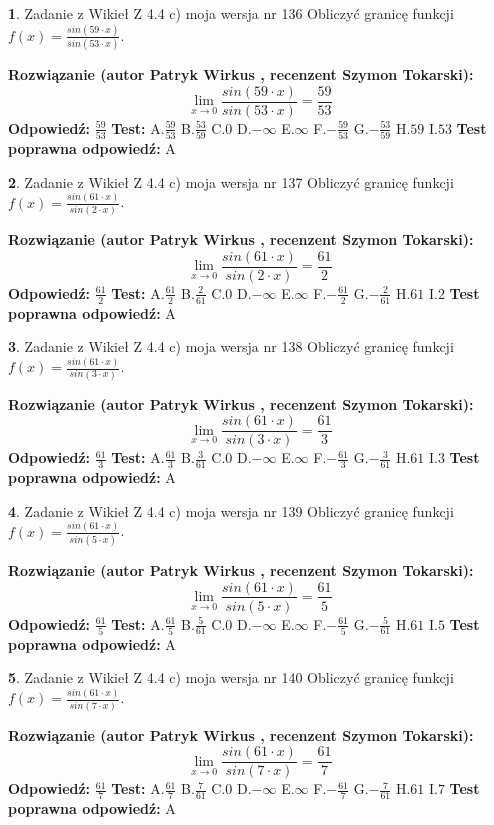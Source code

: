 \documentclass[12pt, a4paper]{article}
\theoremstyle{definition} %
\newtheorem{zad}{}
\newcommand{\zadStart}[1]{\begin{zad}#1\newline}
\newcommand{\zadStop}{\end{zad}}
\newcommand{\rozwStart}[2]{\noindent \textbf{Rozwiązanie (autor #1 , recenzent #2): }\newline}
\newcommand{\rozwStop}{\newline}
\newcommand{\odpStart}{\noindent \textbf{Odpowiedź:}\newline}
\newcommand{\odpStop}{\newline}
\newcommand{\testStart}{\noindent \textbf{Test:}\newline}
\newcommand{\testStop}{\newline}
\newcommand{\kluczStart}{\noindent \textbf{Test poprawna odpowiedź:}\newline}
\newcommand{\kluczStop}{\newline}
\begin{document}
\zadStart{Zadanie z Wikieł Z 4.4 c) moja wersja nr 136}
Obliczyć granicę funkcji $f(x)=\frac{sin(59\cdot x)}{sin(53\cdot x)}$.
\zadStop
\rozwStart{Patryk Wirkus}{Szymon Tokarski}
$$\lim\limits_{x\to 0}\frac{sin(59\cdot x)}{sin(53\cdot x)}=
\frac{59}{53}$$
\rozwStop
\odpStart
$\frac{59}{53}$
\odpStop
\testStart
A.$\frac{59}{53}$
B.$\frac{53}{59}$
C.$0$
D.$-\infty$
E.$\infty$
F.$-\frac{59}{53}$
G.$-\frac{53}{59}$
H.$59$
I.$53$
\testStop
\kluczStart
A
\kluczStop



\zadStart{Zadanie z Wikieł Z 4.4 c) moja wersja nr 137}
Obliczyć granicę funkcji $f(x)=\frac{sin(61\cdot x)}{sin(2\cdot x)}$.
\zadStop
\rozwStart{Patryk Wirkus}{Szymon Tokarski}
$$\lim\limits_{x\to 0}\frac{sin(61\cdot x)}{sin(2\cdot x)}=
\frac{61}{2}$$
\rozwStop
\odpStart
$\frac{61}{2}$
\odpStop
\testStart
A.$\frac{61}{2}$
B.$\frac{2}{61}$
C.$0$
D.$-\infty$
E.$\infty$
F.$-\frac{61}{2}$
G.$-\frac{2}{61}$
H.$61$
I.$2$
\testStop
\kluczStart
A
\kluczStop



\zadStart{Zadanie z Wikieł Z 4.4 c) moja wersja nr 138}
Obliczyć granicę funkcji $f(x)=\frac{sin(61\cdot x)}{sin(3\cdot x)}$.
\zadStop
\rozwStart{Patryk Wirkus}{Szymon Tokarski}
$$\lim\limits_{x\to 0}\frac{sin(61\cdot x)}{sin(3\cdot x)}=
\frac{61}{3}$$
\rozwStop
\odpStart
$\frac{61}{3}$
\odpStop
\testStart
A.$\frac{61}{3}$
B.$\frac{3}{61}$
C.$0$
D.$-\infty$
E.$\infty$
F.$-\frac{61}{3}$
G.$-\frac{3}{61}$
H.$61$
I.$3$
\testStop
\kluczStart
A
\kluczStop



\zadStart{Zadanie z Wikieł Z 4.4 c) moja wersja nr 139}
Obliczyć granicę funkcji $f(x)=\frac{sin(61\cdot x)}{sin(5\cdot x)}$.
\zadStop
\rozwStart{Patryk Wirkus}{Szymon Tokarski}
$$\lim\limits_{x\to 0}\frac{sin(61\cdot x)}{sin(5\cdot x)}=
\frac{61}{5}$$
\rozwStop
\odpStart
$\frac{61}{5}$
\odpStop
\testStart
A.$\frac{61}{5}$
B.$\frac{5}{61}$
C.$0$
D.$-\infty$
E.$\infty$
F.$-\frac{61}{5}$
G.$-\frac{5}{61}$
H.$61$
I.$5$
\testStop
\kluczStart
A
\kluczStop



\zadStart{Zadanie z Wikieł Z 4.4 c) moja wersja nr 140}
Obliczyć granicę funkcji $f(x)=\frac{sin(61\cdot x)}{sin(7\cdot x)}$.
\zadStop
\rozwStart{Patryk Wirkus}{Szymon Tokarski}
$$\lim\limits_{x\to 0}\frac{sin(61\cdot x)}{sin(7\cdot x)}=
\frac{61}{7}$$
\rozwStop
\odpStart
$\frac{61}{7}$
\odpStop
\testStart
A.$\frac{61}{7}$
B.$\frac{7}{61}$
C.$0$
D.$-\infty$
E.$\infty$
F.$-\frac{61}{7}$
G.$-\frac{7}{61}$
H.$61$
I.$7$
\testStop
\kluczStart
A
\kluczStop
\end{document}

